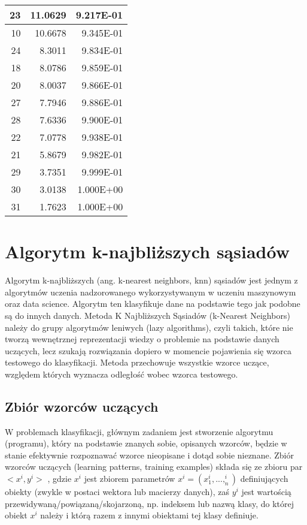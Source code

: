 \documentclass[runningheads]{llncs}
\begin{document}
\begin{table}[htbp]
\begin{tabular}{|r|r|r|}
    \hline
    23 & 11.0629 & 9.217E-01 \bigstrut\\
    \hline
    10 & 10.6678 & 9.345E-01 \bigstrut\\
    \hline
    24 & 8.3011 & 9.834E-01 \bigstrut\\
    \hline
    18 & 8.0786 & 9.859E-01 \bigstrut\\
    \hline
    20 & 8.0037 & 9.866E-01 \bigstrut\\
    \hline
    27 & 7.7946 & 9.886E-01 \bigstrut\\
    \hline
    28 & 7.6336 & 9.900E-01 \bigstrut\\
    \hline
    22 & 7.0778 & 9.938E-01 \bigstrut\\
    \hline
    21 & 5.8679 & 9.982E-01 \bigstrut\\
    \hline
    29 & 3.7351 & 9.999E-01 \bigstrut\\
    \hline
    30 & 3.0138 & 1.000E+00 \bigstrut\\
    \hline
    31 & 1.7623 & 1.000E+00 \bigstrut\\
    \hline
    \end{tabular}%
  \label{tab:addlabel}%
\end{table}%
\section{Algorytm k-najbliższych sąsiadów}
Algorytm k-najbliższych (ang. k-nearest neighbors, knn)\cite{knn} sąsiadów jest jednym z algorytmów uczenia nadzorowanego wykorzystywanym w uczeniu maszynowym oraz data science. Algorytm ten klasyfikuje dane na podstawie tego jak podobne są do innych danych.
Metoda K Najbliższych Sąsiadów (k-Nearest Neighbors) należy do grupy algorytmów leniwych (lazy algorithms), czyli takich, które nie tworzą wewnętrznej reprezentacji wiedzy o problemie na podstawie danych uczących, lecz szukają rozwiązania dopiero w momencie pojawienia się wzorca testowego do klasyfikacji. Metoda przechowuje wszystkie wzorce uczące, względem których wyznacza odległość wobec wzorca testowego. 

\subsection{Zbiór wzorców uczących}

W problemach klasyfikacji, głównym zadaniem jest stworzenie algorytmu (programu), który na podstawie znanych sobie, opisanych wzorców, będzie w stanie efektywnie rozpoznawać wzorce nieopisane i dotąd sobie nieznane. Zbiór wzorców uczących (learning patterns, training examples) składa się ze zbioru par 
    $ <x^{i},y^{i}> $ , gdzie    $ x^{i} $ jest zbiorem parametrów 
    $   x^{i}= (x_{1}^{i},...,_{n}^{i}) $ definiujących obiekty (zwykle w postaci wektora lub macierzy danych), zaś  $ y^{i} $ jest wartością przewidywaną/powiązaną/skojarzoną, np. indeksem lub nazwą klasy, do której obiekt $ x^{i} $  należy i którą razem z innymi obiektami tej klasy definiuje.
    
\end{document}
